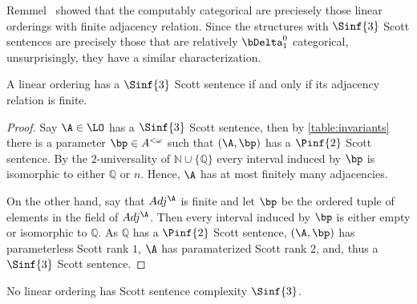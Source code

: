 \documentclass{amsart}
\newcommand{\Q}{\mathbb{Q}}
\begin{document}
Remmel~\cite{remmel1981a} showed that the computably categorical are preciesely
those linear orderings with finite adjacency relation. Since the structures with
$\Sinf{3}$ Scott sentences are precisely those that are relatively
$\bDelta^0_1$ categorical, unsurprisingly, they have a similar
characterization. 
\begin{theorem}\label{thm:remmel}
  A linear ordering has a $\Sinf{3}$ Scott sentence if and only if its adjacency
  relation is finite.
\end{theorem}
\begin{proof}
  Say $\A\in \LO$ has a $\Sinf{3}$ Scott sentence, then by
  \cref{table:invariants} there is a
  parameter $\bp\in A^{<\omega}$ such that $(\A,\bp)$ has a $\Pinf{2}$ Scott
  sentence. By the $2$-universality of $\mathbb N\cup \{\Q\}$ every interval
  induced by $\bp$ is isomorphic to either $\Q$ or $n$. Hence, $\A$ has at
  most finitely many adjacencies.

  On the other hand, say that $Adj^\A$ is finite and let $\bp$ be the ordered
  tuple of elements in the field of $Adj^\A$. Then every interval induced by
  $\bp$ is either empty or isomorphic to $\Q$. As $\Q$ has a $\Pinf{2}$
  Scott sentence, $(\A,\bp)$ has parameterless Scott rank $1$, $\A$ has
  paramaterized Scott rank $2$, and, thus a $\Sinf{3}$ Scott sentence.
\end{proof}
\begin{theorem}\label{thm:nosigma3}
  No linear ordering has Scott sentence complexity $\Sinf{3}$.
\end{theorem}
\end{document}
